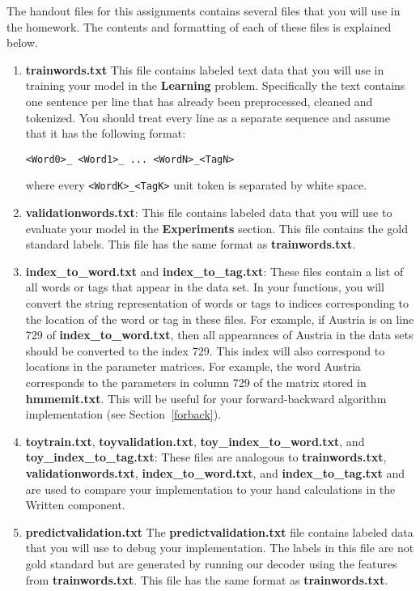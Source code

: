 \documentclass[11pt,addpoints,answers]{exam}
\begin{document}
The handout files for this assignments contains several files that you will use in the homework. The contents and formatting of each of these files is explained below. 
\begin{enumerate}

\item \textbf{trainwords.txt} This file contains labeled text data that you will use in training your model in the \textbf{Learning} problem. Specifically the text contains one sentence per line that has already been preprocessed, cleaned and tokenized. You should treat every line as a separate sequence and assume that it has the following format:

    \texttt{<Word0>\_<Tag0> <Word1>\_<Tag1> ... <WordN>\_<TagN>}

where every \texttt{<WordK>\_<TagK>} unit token is separated by white space.

\item \textbf{validationwords.txt}: This file contains labeled data that you will use to evaluate your model in the \textbf{Experiments} section. This file contains the gold standard labels.  This file has the same format as \textbf{trainwords.txt}.
    
\item \textbf{index\_to\_word.txt} and \textbf{index\_to\_tag.txt}: These files contain a list of all words or tags that appear in the data set. In your functions, you will convert the string representation of words or tags to indices corresponding to the location of the word or tag in these files. For example, if Austria is on line 729 of \textbf{index\_to\_word.txt}, then all appearances of Austria in the data sets should be converted to the index 729. This index will also correspond to locations in the parameter matrices. For example, the word Austria corresponds to the parameters in column 729 of the matrix stored in \textbf{hmmemit.txt}. This will be useful for your forward-backward algorithm implementation (see Section~\ref{forback}).
    
\item \textbf{toytrain.txt}, \textbf{toyvalidation.txt}, \textbf{toy\_index\_to\_word.txt}, and \textbf{toy\_index\_to\_tag.txt}: These files are analogous to \textbf{trainwords.txt}, \textbf{validationwords.txt}, \textbf{index\_to\_word.txt}, and \textbf{index\_to\_tag.txt} and are used to compare your implementation to your hand calculations in the Written component.

\item \textbf{predictvalidation.txt} The \textbf{predictvalidation.txt} file contains labeled data that you will use to debug your implementation. The labels in this file are not gold standard but are generated by running our decoder using the features from \textbf{trainwords.txt}. This file has the same format as \textbf{trainwords.txt}.


\end{enumerate}
\end{document}
